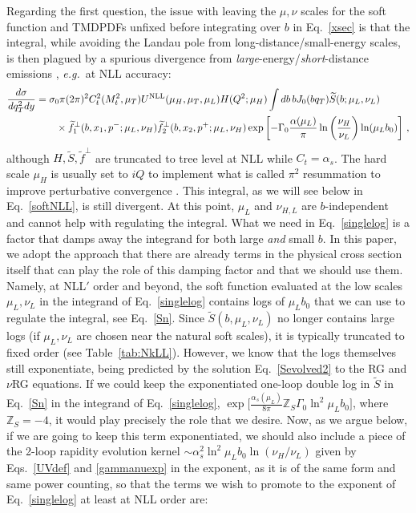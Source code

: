 \documentclass[a4,letterpaper,11pt]{article}
\newcommand{\nn}{\nonumber}
\newcommand{\as}{\alpha_s}
\newcommand{\eg}{\emph{e.g.}~}
\newcommand{\zed}{\mathbb{Z}}
\newcommand{\wt}{\widetilde}
\newcommand{\eq}[1]{Eq.~\eqref{#1}}
\newcommand{\eqs}[2]{Eqs.~\eqref{#1} and \eqref{#2}}
\newcommand{\tab}[1]{Table~\ref{tab:#1}}
\begin{document}
Regarding the first question, the issue with leaving the $\mu,\nu$ scales for the soft function and TMDPDFs unfixed before integrating over $b$ in \eq{xsec} is that the integral, while avoiding the Landau pole from long-distance/small-energy scales, is then plagued by a spurious divergence from \emph{large}-energy/\emph{short}-distance emissions \cite{Chiu:2012ir}, \eg at NLL accuracy:
\begin{align}
\label{singlelog}
 \frac{d \sigma}{d q_T^2 dy} &=\sigma_0 \pi (2\pi)^2 C_t^2(M_t^2, \mu_T)U^{\rm NLL}(\mu_H, \mu_T, \mu_L) H(Q^2;\mu_H)  \int db\, b J_0(b q_T) \wt S(b;\mu_L,\nu_L) \\ 
 &\qquad \times \wt f_1^\perp(b,x_1,p^-;\mu_L,\nu_H) \wt f_2^\perp(b,x_2,p^+;\mu_L,\nu_H)  \exp\left[ -\Gamma_0 \frac{\alpha(\mu_L)}{\pi}\ln\left(\frac{\nu_H}{\nu_L}\right)\ln(\mu_L b_0) \right]\,, \nn
 \end{align}
 although $ H,\wt S,\wt f^\perp$ are truncated to tree level at NLL while $C_t= \as$. 
 The hard scale $\mu_H$ is usually set to $i Q$ to implement what is called $\pi^2$ resummation to improve perturbative convergence \cite{Ahrens:2008qu,Ahrens:2008nc}. 
 This integral, as we will see below in \eq{softNLL}, is still divergent. At this point, $\mu_L$ and $\nu_{H,L}$ are $b$-independent and cannot help with regulating the integral. What we need in \eq{singlelog} is a factor that damps away the integrand for both large \emph{and} small $b$. 
 In this paper, we adopt the approach that there are already terms in the physical cross section itself that can play the role of this damping factor and that we should use them. Namely, at NLL$'$ order and beyond, the soft function evaluated at the low scales $\mu_L,\nu_L$ in the integrand of \eq{singlelog} contains logs of $\mu_L b_0$ that we can use to regulate the integral, see \eq{Sn}. Since $\wt S(b,\mu_L,\nu_L)$ no longer contains large logs (if $\mu_L,\nu_L$ are chosen near the natural soft scales), it is typically truncated to fixed order (see \tab{NkLL}). However, we know that the logs themselves still exponentiate, being predicted by the solution \eq{Sevolved2} to the RG and $\nu$RG equations. If we could keep the exponentiated one-loop double log in $\wt S$ in \eq{Sn} in the integrand of \eq{singlelog}, $\exp\bigl[\frac{\as(\mu_L)}{8\pi}\zed_S \Gamma_0 \ln^2\mu_L b_0\bigr]$, where $\zed_S = -4$, it would play precisely the role that we desire. Now, as we argue below, if we are going to keep this term exponentiated, we should also include a piece of the 2-loop rapidity evolution kernel $\sim \as^2 \ln^2\mu_L b_0 \ln(\nu_H/\nu_L)$ given by \eqs{UVdef}{gammanuexp} in the exponent, as it is of the same form and same power counting, so that the terms we wish to promote to the exponent of \eq{singlelog} at least at NLL order are:
\end{document}
